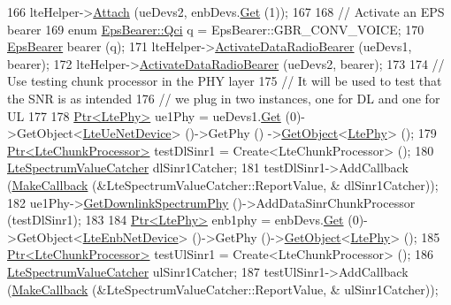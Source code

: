 \begin{DoxyCode}
166   lteHelper->\hyperlink{classns3_1_1LteHelper_a9466743f826aa2652a87907b7f0a1c87}{Attach} (ueDevs2, enbDevs.\hyperlink{classns3_1_1NetDeviceContainer_a677d62594b5c9d2dea155cc5045f4d0b}{Get} (1));
167 
168   \textcolor{comment}{// Activate an EPS bearer}
169   \textcolor{keyword}{enum} \hyperlink{structns3_1_1EpsBearer_aecf0c67109c5eb4ec0b07226fff5885e}{EpsBearer::Qci} q = EpsBearer::GBR\_CONV\_VOICE;
170   \hyperlink{structns3_1_1EpsBearer}{EpsBearer} bearer (q);
171   lteHelper->\hyperlink{classns3_1_1LteHelper_ac896e16cf162e4beeaa292d39ab1b700}{ActivateDataRadioBearer} (ueDevs1, bearer);
172   lteHelper->\hyperlink{classns3_1_1LteHelper_ac896e16cf162e4beeaa292d39ab1b700}{ActivateDataRadioBearer} (ueDevs2, bearer);
173 
174   \textcolor{comment}{// Use testing chunk processor in the PHY layer}
175   \textcolor{comment}{// It will be used to test that the SNR is as intended}
176   \textcolor{comment}{// we plug in two instances, one for DL and one for UL}
177 
178   \hyperlink{classns3_1_1Ptr}{Ptr<LtePhy>} ue1Phy = ueDevs1.\hyperlink{classns3_1_1NetDeviceContainer_a677d62594b5c9d2dea155cc5045f4d0b}{Get} (0)->GetObject<\hyperlink{classns3_1_1LteUeNetDevice}{LteUeNetDevice}> ()->GetPhy ()
      ->\hyperlink{classns3_1_1Object_a13e18c00017096c8381eb651d5bd0783}{GetObject}<\hyperlink{classns3_1_1LtePhy}{LtePhy}> ();
179   \hyperlink{classns3_1_1Ptr}{Ptr<LteChunkProcessor>} testDlSinr1 = Create<LteChunkProcessor> ();
180   \hyperlink{classns3_1_1LteSpectrumValueCatcher}{LteSpectrumValueCatcher} dlSinr1Catcher;
181   testDlSinr1->AddCallback (\hyperlink{group__makecallbackmemptr_ga9376283685aa99d204048d6a4b7610a4}{MakeCallback} (&LteSpectrumValueCatcher::ReportValue, &
      dlSinr1Catcher));
182   ue1Phy->\hyperlink{classns3_1_1LtePhy_a9560f8862545c7c5760e7f6737c5b938}{GetDownlinkSpectrumPhy} ()->AddDataSinrChunkProcessor (testDlSinr1);
183 
184   \hyperlink{classns3_1_1Ptr}{Ptr<LtePhy>} enb1phy = enbDevs.\hyperlink{classns3_1_1NetDeviceContainer_a677d62594b5c9d2dea155cc5045f4d0b}{Get} (0)->GetObject<\hyperlink{classns3_1_1LteEnbNetDevice}{LteEnbNetDevice}> ()->GetPhy
       ()->\hyperlink{classns3_1_1Object_a13e18c00017096c8381eb651d5bd0783}{GetObject}<\hyperlink{classns3_1_1LtePhy}{LtePhy}> ();
185   \hyperlink{classns3_1_1Ptr}{Ptr<LteChunkProcessor>} testUlSinr1 = Create<LteChunkProcessor> ();
186   \hyperlink{classns3_1_1LteSpectrumValueCatcher}{LteSpectrumValueCatcher} ulSinr1Catcher;
187   testUlSinr1->AddCallback (\hyperlink{group__makecallbackmemptr_ga9376283685aa99d204048d6a4b7610a4}{MakeCallback} (&LteSpectrumValueCatcher::ReportValue, &
      ulSinr1Catcher));

\end{DoxyCode}
